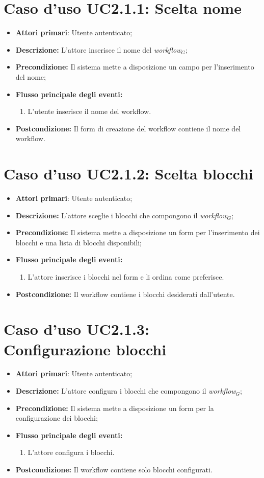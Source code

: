 \section{Caso d'uso UC2.1.1: Scelta nome }
\begin{itemize}
	\item \textbf{Attori primari}: Utente autenticato;
	\item \textbf{Descrizione:} L'attore inserisce il nome del \textit{workflow$_{G}$};
	\item \textbf{Precondizione:} Il sistema mette a disposizione un campo per l'inserimento del nome;
	\item \textbf{Flusso principale degli eventi:}
	\begin{enumerate}
		\item L'utente inserisce il nome del workflow.
	\end{enumerate}
	\item \textbf{Postcondizione:} Il form di creazione del workflow contiene il nome del workflow.
\end{itemize}
\section{Caso d'uso UC2.1.2: Scelta blocchi }
\begin{itemize}
	\item \textbf{Attori primari}: Utente autenticato;
	\item \textbf{Descrizione:} L'attore sceglie i blocchi che compongono il \textit{workflow$_{G}$};
	\item \textbf{Precondizione:} Il sistema mette a disposizione un form per l'inserimento dei blocchi e una lista di blocchi disponibili;
	\item \textbf{Flusso principale degli eventi:}
	\begin{enumerate}
		\item L'attore inserisce i blocchi nel form e li ordina come preferisce.
	\end{enumerate}
	\item \textbf{Postcondizione:} Il workflow contiene i blocchi desiderati dall'utente.
\end{itemize}
\section{Caso d'uso UC2.1.3: Configurazione blocchi }
\begin{itemize}
	\item \textbf{Attori primari}: Utente autenticato;
	\item \textbf{Descrizione:} L'attore configura i blocchi che compongono il \textit{workflow$_{G}$};
	\item \textbf{Precondizione:} Il sistema mette a disposizione un form per la configurazione dei blocchi;
	\item \textbf{Flusso principale degli eventi:}
	\begin{enumerate}
		\item L'attore configura i blocchi.
	\end{enumerate}
	\item \textbf{Postcondizione:} Il workflow contiene solo blocchi configurati.
\end{itemize}
